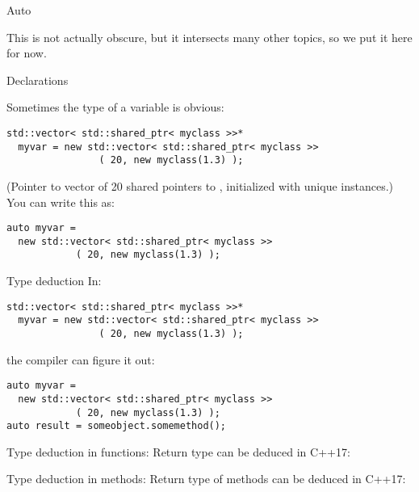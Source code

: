 
 {Auto}

This is not actually obscure, but it intersects many other topics, so
we put it here for now.

 {Declarations}

Sometimes the type of a variable is obvious:
\begin{lstlisting}
std::vector< std::shared_ptr< myclass >>*
  myvar = new std::vector< std::shared_ptr< myclass >>
                ( 20, new myclass(1.3) );
\end{lstlisting}
(Pointer to vector of 20 shared pointers to , initialized
with unique instances.)  You can write this as:
\begin{lstlisting}
auto myvar =
  new std::vector< std::shared_ptr< myclass >>
            ( 20, new myclass(1.3) );
\end{lstlisting}

\begin{slide}{Type deduction}
  \label{sl:auto-deduct}
In:
\begin{lstlisting}
std::vector< std::shared_ptr< myclass >>*
  myvar = new std::vector< std::shared_ptr< myclass >>
                ( 20, new myclass(1.3) );
\end{lstlisting}
the compiler can figure it out:
\begin{lstlisting}
auto myvar =
  new std::vector< std::shared_ptr< myclass >>
            ( 20, new myclass(1.3) );
auto result = someobject.somemethod();
\end{lstlisting}
\end{slide}

\begin{block}{Type deduction in functions}:
  \label{sl:auto-fun}
  Return type can be deduced in C++17:
\end{block}

\begin{block}{Type deduction in methods}:
  \label{sl:auto-method}
  Return type of methods can be deduced in C++17:
  \lstset{numbers=left,numberstyle=\tiny}
\end{block}


